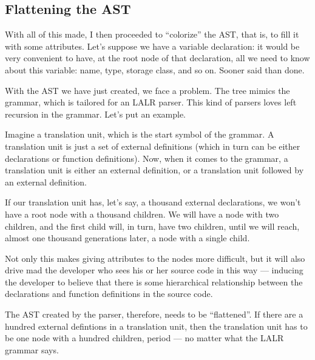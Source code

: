 \documentclass[a4paper,openany]{refrep}
\begin{document}
\subsection{Flattening the AST}
With all of this made, I then proceeded to ``colorize'' the AST, that is, to fill it with some attributes. Let's suppose we have a variable declaration: it would be very convenient to have, at the root node of that declaration, all we need to know about this variable: name, type, storage class, and so on. Sooner said than done.

With the AST we have just created, we face a problem. The tree mimics the grammar, which is tailored for an LALR parser. This kind of parsers loves left recursion in the grammar. Let's put an example.

Imagine a translation unit, which is the start symbol of the grammar. A translation unit is just a set of external definitions (which in turn can be either declarations or function definitions). Now, when it comes to the grammar, a translation unit is either an external definition, or a translation unit followed by an external definition.

If our translation unit has, let's say, a thousand external declarations, we won't have a root node with a thousand children. We will have a node with two children, and the first child will, in turn, have two children, until we will reach, almost one thousand generations later, a node with a single child.

Not only this makes giving attributes to the nodes more difficult, but it will also drive mad the developer who sees his or her source code in this way --- inducing the developer to believe that there is some hierarchical relationship between the declarations and function definitions in the source code.

The AST created by the parser, therefore, needs to be ``flattened''. If there are a hundred external defintions in a translation unit, then the translation unit has to be one node with a hundred children, period --- no matter what the LALR grammar says.
\end{document}

